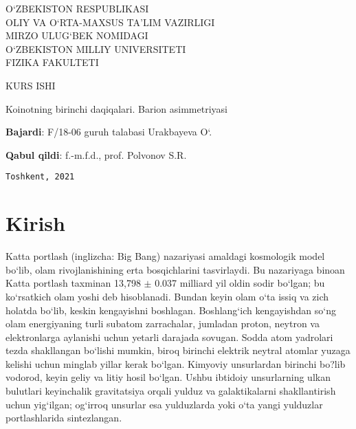 \documentclass[14pt]{scrartcl}
\begin{document}
	\begin{titlepage}
		\pagestyle{fancy}
		\begin{center}
			O`ZBEKISTON RESPUBLIKASI\\ OLIY VA O`RTA-MAXSUS TA'LIM VAZIRLIGI\\
			MIRZO ULUG`BEK NOMIDAGI\\ O`ZBEKISTON MILLIY UNIVERSITETI\\
			FIZIKA FAKULTETI
		\end{center}
	\vfill
	\begin{center}
		\textsc{\Huge{KURS ISHI}}
	\end{center}

\begin{center}
	\textrm{\Large {Koinotning birinchi daqiqalari. Barion asimmetriyasi}}
\end{center}
\vfill
\begin{flushleft}
	\textbf{Bajardi}: F/18-06 guruh talabasi Urakbayeva O`.
	
	\textbf{Qabul qildi}: f.-m.f.d., prof. Polvonov S.R.
\end{flushleft}

\vfill
\vfill
\begin{center}
	\texttt{Toshkent, 2021}
\end{center}
	\end{titlepage}
\renewcommand{\abstractname}{Kirish}
\renewcommand{\contentsname}{Mundarija}
\tableofcontents
{}
\newpage
\section*{Kirish}
\hspace{0.6cm}Katta portlash (inglizcha: Big Bang) nazariyasi amaldagi kosmologik model bo`lib, olam rivojlanishining erta bosqichlarini tasvirlaydi. Bu nazariyaga binoan Katta portlash taxminan 13,798 $\pm$ 0.037 milliard yil oldin sodir bo`lgan; bu ko`rsatkich olam yoshi deb hisoblanadi. Bundan keyin olam o`ta issiq va zich holatda bo`lib, keskin kengayishni boshlagan. Boshlang`ich kengayishdan so`ng olam energiyaning turli subatom zarrachalar, jumladan proton, neytron va elektronlarga aylanishi uchun yetarli darajada sovugan. Sodda atom yadrolari tezda shakllangan bo`lishi mumkin, biroq birinchi elektrik neytral atomlar yuzaga kelishi uchun minglab yillar kerak bo`lgan. Kimyoviy unsurlardan birinchi bo?lib vodorod, keyin geliy va litiy hosil bo`lgan. Ushbu ibtidoiy unsurlarning ulkan bulutlari keyinchalik gravitatsiya orqali yulduz va galaktikalarni shakllantirish uchun yig`ilgan; og`irroq unsurlar esa yulduzlarda yoki o`ta yangi yulduzlar portlashlarida sintezlangan.
\end{document}
